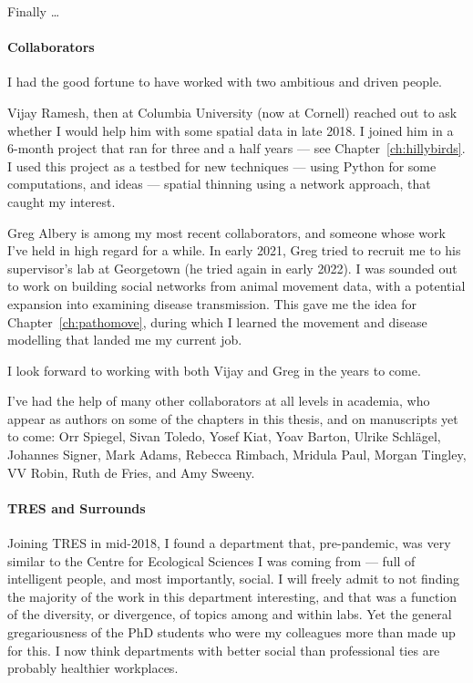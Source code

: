 Finally \ldots

\paragraph*{Collaborators}

I had the good fortune to have worked with two ambitious and driven people.

Vijay Ramesh, then at Columbia University (now at Cornell) reached out to ask whether I would help him with some spatial data in late 2018.
I joined him in a 6-month project that ran for three and a half years --- see Chapter~\ref{ch:hillybirds}.
I used this project as a testbed for new techniques --- using Python for some computations, and ideas --- spatial thinning using a network approach, that caught my interest.

Greg Albery is among my most recent collaborators, and someone whose work I've held in high regard for a while.
In early 2021, Greg tried to recruit me to his supervisor's lab at Georgetown (he tried again in early 2022).
I was sounded out to work on building social networks from animal movement data, with a potential expansion into examining disease transmission.
This gave me the idea for Chapter~\ref{ch:pathomove}, during which I learned the movement and disease modelling that landed me my current job.

I look forward to working with both Vijay and Greg in the years to come.

I've had the help of many other collaborators at all levels in academia, who appear as authors on some of the chapters in this thesis, and on manuscripts yet to come: Orr Spiegel, Sivan Toledo, Yosef Kiat, Yoav Barton, Ulrike Schl{\"a}gel, Johannes Signer, Mark Adams, Rebecca Rimbach, Mridula Paul, Morgan Tingley, VV Robin, Ruth de Fries, and Amy Sweeny.

\paragraph*{TRES and Surrounds}

Joining TRES in mid-2018, I found a department that, pre-pandemic, was very similar to the Centre for Ecological Sciences I was coming from --- full of intelligent people, and most importantly, social.
I will freely admit to not finding the majority of the work in this department interesting, and that was a function of the diversity, or divergence, of topics among and within labs.
Yet the general gregariousness of the PhD students who were my colleagues more than made up for this.
I now think departments with better social than professional ties are probably healthier workplaces.

